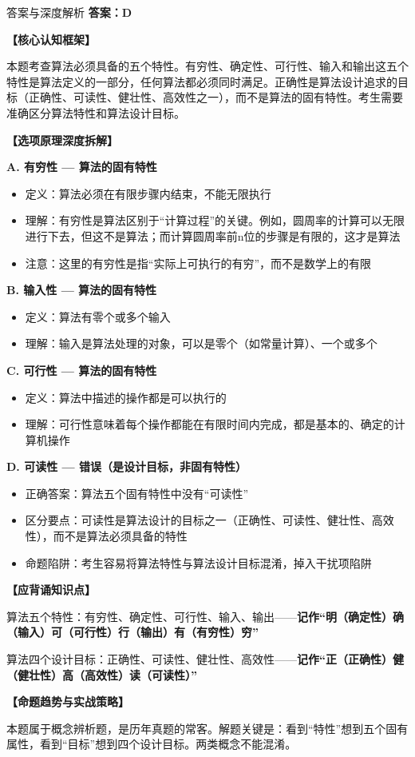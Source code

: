 \documentclass[12pt, a4paper]{article}
\newenvironment{bluebox}{\begin{framed}\begin{minipage}{\textwidth}}{\end{minipage}\end{framed}}
\begin{document}
\begin{bluebox}{答案与深度解析}
	\textbf{答案：D}

	\textbf{【核心认知框架】}

	本题考查算法必须具备的五个特性。有穷性、确定性、可行性、输入和输出这五个特性是算法定义的一部分，任何算法都必须同时满足。正确性是算法设计追求的目标（正确性、可读性、健壮性、高效性之一），而不是算法的固有特性。考生需要准确区分算法特性和算法设计目标。

	\textbf{【选项原理深度拆解】}

	\item \textbf{A. 有穷性 — 算法的固有特性}
	\begin{itemize}
		\item 定义：算法必须在有限步骤内结束，不能无限执行
		\item 理解：有穷性是算法区别于“计算过程”的关键。例如，圆周率的计算可以无限进行下去，但这不是算法；而计算圆周率前n位的步骤是有限的，这才是算法
		\item 注意：这里的有穷性是指“实际上可执行的有穷”，而不是数学上的有限
	\end{itemize}

	\item \textbf{B. 输入性 — 算法的固有特性}
	\begin{itemize}
		\item 定义：算法有零个或多个输入
		\item 理解：输入是算法处理的对象，可以是零个（如常量计算）、一个或多个
	\end{itemize}

	\item \textbf{C. 可行性 — 算法的固有特性}
	\begin{itemize}
		\item 定义：算法中描述的操作都是可以执行的
		\item 理解：可行性意味着每个操作都能在有限时间内完成，都是基本的、确定的计算机操作
	\end{itemize}

	\item \textbf{D. 可读性 — 错误（是设计目标，非固有特性）}
	\begin{itemize}
		\item 正确答案：算法五个固有特性中没有“可读性”
		\item 区分要点：可读性是算法设计的目标之一（正确性、可读性、健壮性、高效性），而不是算法必须具备的特性
		\item 命题陷阱：考生容易将算法特性与算法设计目标混淆，掉入干扰项陷阱
	\end{itemize}

	\textbf{【应背诵知识点】}

	算法五个特性：有穷性、确定性、可行性、输入、输出——\textbf{记作“明（确定性）确（输入）可（可行性）行（输出）有（有穷性）穷”}

	算法四个设计目标：正确性、可读性、健壮性、高效性——\textbf{记作“正（正确性）健（健壮性）高（高效性）读（可读性）”}

	\textbf{【命题趋势与实战策略】}

	本题属于概念辨析题，是历年真题的常客。解题关键是：看到“特性”想到五个固有属性，看到“目标”想到四个设计目标。两类概念不能混淆。
\end{bluebox}
\end{document}
